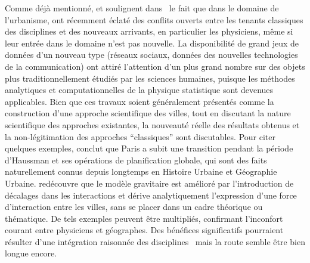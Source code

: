 {Comme déjà mentionné,  et  soulignent dans~\cite{dupuy2015sciences} le fait que dans le domaine de l'urbanisme, ont récemment éclaté des conflits ouverts entre les tenants classiques des disciplines et des nouveaux arrivants, en particulier les physiciens, même si leur entrée dans le domaine n'est pas nouvelle. La disponibilité de grand jeux de données d'un nouveau type (réseaux sociaux, données des nouvelles technologies de la communication) ont attiré l'attention d'un plus grand nombre sur des objets plus traditionnellement étudiés par les sciences humaines, puisque les méthodes analytiques et computationnelles de la physique statistique sont devenues applicables. Bien que ces travaux soient généralement présentés comme la construction d'une approche scientifique des villes, tout en discutant la nature scientifique des approches existantes, la nouveauté réelle des résultats obtenus et la non-légitimation des approches ``classiques'' sont discutables. Pour citer quelques exemples, \cite{barthelemy2013self} conclut que Paris a subit une transition pendant la période d'Haussman et ses opérations de planification globale, qui sont des faits naturellement connus depuis longtemps en Histoire Urbaine et Géographie Urbaine. \cite{chen2009urban} redécouvre que le modèle gravitaire est amélioré par l'introduction de décalages dans les interactions et dérive analytiquement l'expression d'une force d'interaction entre les villes, sans se placer dans un cadre théorique ou thématique. De tels exemples peuvent être multipliés, confirmant l'inconfort courant entre physiciens et géographes. Des bénéfices significatifs pourraient résulter d'une intégration raisonnée des disciplines~\cite{o2015physicists} mais la route semble être bien longue encore.
}





